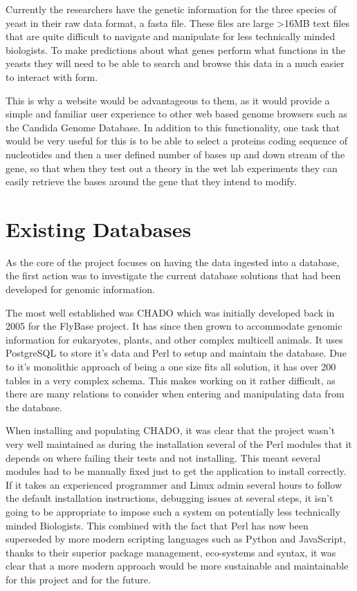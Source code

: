 Currently the researchers have the genetic information for the three species of yeast in their raw data format, a fasta file. These files are large \textgreater 16MB text files that are quite difficult to navigate and manipulate for less technically minded biologists. To make predictions about what genes perform what functions in the yeasts they will need to be able to search and browse this data in a much easier to interact with form. 

This is why a website would be advantageous to them, as it would provide a simple and familiar user experience to other web based genome browsers such as the Candida Genome Database\cite{cgd}. In addition to this functionality, one task that would be very useful for this is to be able to select a proteins coding sequence of nucleotides and then a user defined number of bases up and down stream of the gene, so that when they test out a theory in the wet lab experiments they can easily retrieve the bases around the gene that they intend to modify. 

\section{Existing Databases}
As the core of the project focuses on having the data ingested into a database, the first action was to investigate the current database solutions that had been developed for genomic information. 

The most well established was CHADO\cite{chado} which was initially developed back in 2005 for the FlyBase\cite{flybase} project. It has since then grown to accommodate genomic information for eukaryotes, plants, and other complex multicell animals. It uses PostgreSQL\cite{postgres} to store it's data and Perl\cite{perl} to setup and maintain the database. Due to it's monolithic approach of being a one size fits all solution, it has over 200 tables in a very complex schema. This makes working on it rather difficult, as there are many relations to consider when entering and manipulating data from the database.

When installing and populating CHADO, it was clear that the project wasn't very well maintained as during the installation several of the Perl modules that it depends on where failing their tests and not installing. This meant several modules had to be manually fixed just to get the application to install correctly. If it takes an experienced programmer and Linux admin several hours to follow the default installation instructions, debugging issues at several steps, it isn't going to be appropriate to impose such a system on potentially less technically minded Biologists. This combined with the fact that Perl has now been superseded by more modern scripting languages such as Python\cite{python} and JavaScript\cite{node}, thanks to their superior package management, eco-systems and syntax, it was clear that a more modern approach would be more sustainable and maintainable for this project and for the future. 

